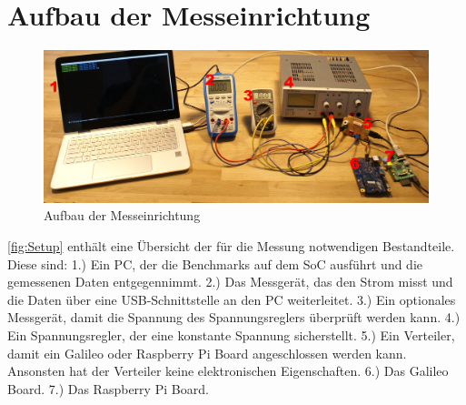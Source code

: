\section{Aufbau der Messeinrichtung}

\begin{figure}[H]
\centering
\includegraphics[width=1.0\textwidth, height=0.33\textwidth]{images/setup.jpg}
\caption{Aufbau der Messeinrichtung}
\label{fig:Setup}
\end{figure}

\autoref{fig:Setup} enthält eine Übersicht der für die Messung notwendigen Bestandteile. Diese sind: 1.) Ein PC, der die Benchmarks auf dem SoC ausführt und die gemessenen Daten entgegennimmt. 2.) Das Messgerät, das den Strom misst und die Daten über eine USB-Schnittstelle an den PC weiterleitet. 3.) Ein optionales Messgerät, damit die Spannung des Spannungsreglers überprüft werden kann. 4.) Ein Spannungsregler, der eine konstante Spannung sicherstellt. 5.) Ein Verteiler, damit ein Galileo oder Raspberry Pi Board angeschlossen werden kann. Ansonsten hat der Verteiler keine elektronischen Eigenschaften. 6.) Das Galileo Board. 7.) Das Raspberry Pi Board.

